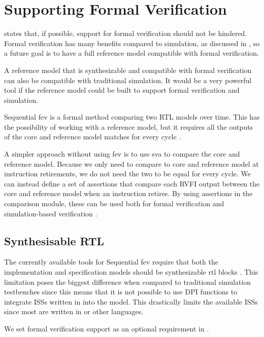 \section{Supporting Formal Verification}

 states that, if possible, support for formal verification should not be hindered. Formal verification has many benefits compared to simulation, as discussed in , so a future goal is to have a full reference model compatible with formal verification.

A reference model that is synthesizable and compatible with formal verification can also be compatible with traditional simulation. It would be a very powerful tool if the reference model could be built to support formal verification and simulation.

Sequential \acrfull{fev} is a formal method comparing two RTL models over time. This has the possibility of working with a reference model, but it requires all the outputs of the core and reference model matches for every cycle \cite{seligmanFormalVerificationEssential2015}.

A simpler approach without using \acrfull{fev} is to use \acrfull{sva} to compare the core and reference model. Because we only need to compare to core and reference model at instruction retirements, we do not need the two to be equal for every cycle. We can instead define a set of assertions that compare each RVFI output between the core and reference model when an instruction retires. By using assertions in the comparison module, these can be used both for formal verification and simulation-based verification \cite{seligmanFormalVerificationEssential2015}.

\subsection{Synthesisable RTL}

The currently available tools for Sequential \acrshort{fev} require that both the implementation and specification models should be synthesizable \acrshort{rtl} blocks \cite{seligmanFormalVerificationEssential2015}. This limitation poses the biggest difference when compared to traditional simulation testbenches since this means that it is not possible to use DPI functions to integrate ISSs written in \cpp into the model. This drastically limits the available ISSs since most are written in \cpp or other languages. 

We set formal verification support as an optional requirement in .



